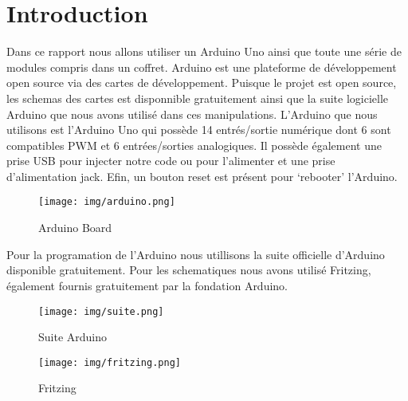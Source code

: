 \chapter{Introduction}
Dans ce rapport nous allons utiliser un Arduino Uno ainsi que toute une série de modules compris dans un coffret. Arduino est une plateforme de développement open source via des cartes de développement. Puisque le projet est open source, les schemas des cartes est disponnible gratuitement ainsi que la suite logicielle Arduino que nous avons utilisé dans ces manipulations.
L'Arduino que nous utilisons est l'Arduino Uno qui possède 14 entrés/sortie numérique dont 6 sont compatibles PWM et 6 entrées/sorties analogiques. Il possède également une prise USB pour injecter notre code ou pour l'alimenter et une prise d'alimentation jack. Efin, un bouton reset est présent pour `rebooter' l'Arduino.
\begin{figure}[h]
	\centering
	\texttt{[image: img/arduino.png]}
	\caption{\label{ArduinoBoard}Arduino Board}
\end{figure}
Pour la programation de l'Arduino nous utillisons la suite officielle d'Arduino disponible gratuitement. Pour les schematiques nous avons utilisé Fritzing, également fournis gratuitement par la fondation Arduino.
\begin{figure}[h]
	\centering
	\texttt{[image: img/suite.png]}
	\caption{\label{SuiteArduino}Suite Arduino}
\end{figure}
\begin{figure}[h]
	\centering
	\texttt{[image: img/fritzing.png]}
	\caption{\label{Fritzing}Fritzing}
\end{figure}